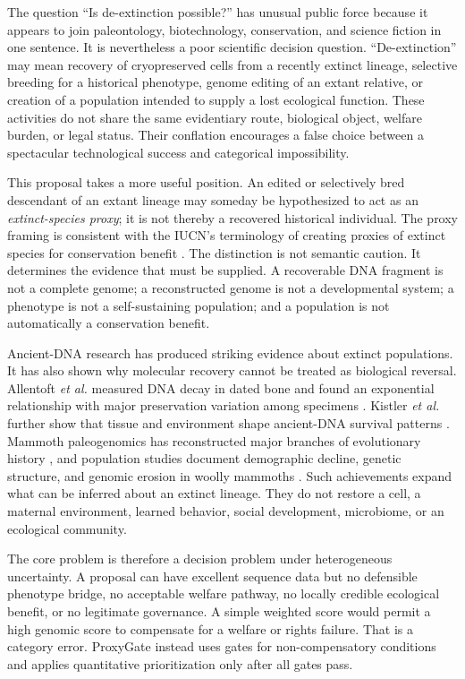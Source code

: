 \documentclass[conference]{IEEEtran}
\begin{document}
The question ``Is de-extinction possible?'' has unusual public force because it appears to join paleontology, biotechnology, conservation, and science fiction in one sentence. It is nevertheless a poor scientific decision question. ``De-extinction'' may mean recovery of cryopreserved cells from a recently extinct lineage, selective breeding for a historical phenotype, genome editing of an extant relative, or creation of a population intended to supply a lost ecological function. These activities do not share the same evidentiary route, biological object, welfare burden, or legal status. Their conflation encourages a false choice between a spectacular technological success and categorical impossibility.

This proposal takes a more useful position. An edited or selectively bred descendant of an extant lineage may someday be hypothesized to act as an \emph{extinct-species proxy}; it is not thereby a recovered historical individual. The proxy framing is consistent with the IUCN's terminology of creating proxies of extinct species for conservation benefit \cite{iucn2016}. The distinction is not semantic caution. It determines the evidence that must be supplied. A recoverable DNA fragment is not a complete genome; a reconstructed genome is not a developmental system; a phenotype is not a self-sustaining population; and a population is not automatically a conservation benefit.

Ancient-DNA research has produced striking evidence about extinct populations. It has also shown why molecular recovery cannot be treated as biological reversal. Allentoft \emph{et al.} measured DNA decay in dated bone and found an exponential relationship with major preservation variation among specimens \cite{allentoft2012}. Kistler \emph{et al.} further show that tissue and environment shape ancient-DNA survival patterns \cite{kistler2017}. Mammoth paleogenomics has reconstructed major branches of evolutionary history \cite{vanderValk2021}, and population studies document demographic decline, genetic structure, and genomic erosion in woolly mammoths \cite{palkopoulou2015,dehasque2024}. Such achievements expand what can be inferred about an extinct lineage. They do not restore a cell, a maternal environment, learned behavior, social development, microbiome, or an ecological community.

The core problem is therefore a decision problem under heterogeneous uncertainty. A proposal can have excellent sequence data but no defensible phenotype bridge, no acceptable welfare pathway, no locally credible ecological benefit, or no legitimate governance. A simple weighted score would permit a high genomic score to compensate for a welfare or rights failure. That is a category error. ProxyGate instead uses gates for non-compensatory conditions and applies quantitative prioritization only after all gates pass.
\end{document}
